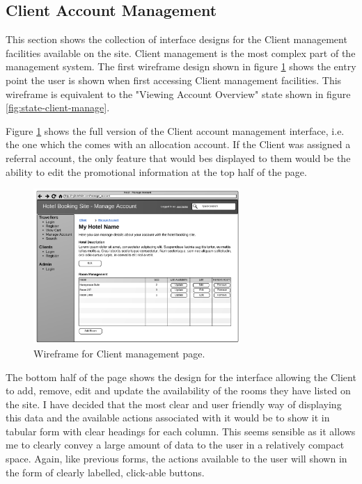 \documentclass{article}
\begin{document}
\subsection{Client Account Management}
This section shows the collection of interface designs for the Client management facilities available on the site. Client management is the most complex part of the management system. The first wireframe design shown in figure \ref{fig:wireframe-client-management} shows the entry point the user is shown when first accessing Client management facilities. This wireframe is equivalent to the "Viewing Account Overview" state shown in figure \ref{fig:state-client-manage}.

Figure \ref{fig:wireframe-client-management} shows the full version of the Client account management interface, i.e. the one which the comes with an allocation account. If the Client was assigned a referral account, the only feature that would bes displayed to them would be the ability to edit the promotional information at the top half of the page.
 
\begin{figure}[H]
\centering
\includegraphics[width=0.7\textwidth]{img/wireframes/ClientManagement.png}
\caption{Wireframe for Client management page.}
\label{fig:wireframe-client-management}
\end{figure}

The bottom half of the page shows the design for the interface allowing the Client to add, remove, edit and update the availability of the rooms they have listed on the site. I have decided that the most clear and user friendly way of displaying this data and the available actions associated with it would be to show it in tabular form with clear headings for each column. This seems sensible as it allows me to clearly convey a large amount of data to the user in a relatively compact space. Again, like previous forms, the actions available to the user will shown in the form of clearly labelled, click-able buttons.
\end{document}
